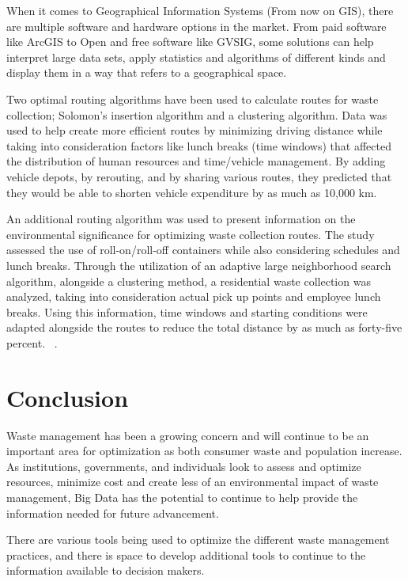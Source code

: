 \documentclass[sigconf]{acmart}
\begin{document}
When it comes to Geographical Information Systems (From now on GIS), there are multiple software and hardware options in the market. From paid software like ArcGIS to Open and free software like GVSIG, some solutions can help interpret large data sets, apply statistics and algorithms of different kinds and display them in a way that refers to a geographical space. %

Two optimal routing algorithms have been used to calculate routes for waste collection; Solomon's insertion algorithm and a clustering algorithm.  Data was used to help create more efficient routes by minimizing driving distance while taking into consideration factors like lunch breaks (time windows) that affected the distribution of human resources and time/vehicle management.  By adding vehicle depots, by rerouting, and by sharing various routes, they predicted that they would be able to shorten vehicle expenditure by as much as 10,000 km.  

An additional routing algorithm was used to present information on the environmental significance for optimizing waste collection routes.  The study assessed the use of roll-on/roll-off containers while also considering schedules and lunch breaks.  Through the utilization of an adaptive large neighborhood search algorithm, alongside a clustering method, a residential waste collection was analyzed, taking into consideration actual pick up points and employee lunch breaks.  Using this information, time windows and starting conditions were adapted alongside the routes to reduce the total distance by as much as forty-five percent. ~\cite{shahrokni2014big}.

\section{Conclusion}
Waste management has been a growing concern and will continue to be an important area for optimization as both consumer waste and population increase.  As institutions, governments, and individuals look to assess and optimize resources, minimize cost and create less of an environmental impact of waste management, Big Data has the potential to continue to help provide the information needed for future advancement.

There are various tools being used to optimize the different waste management practices, and there is space to develop additional tools to continue to the information available to decision makers.
\end{document}
